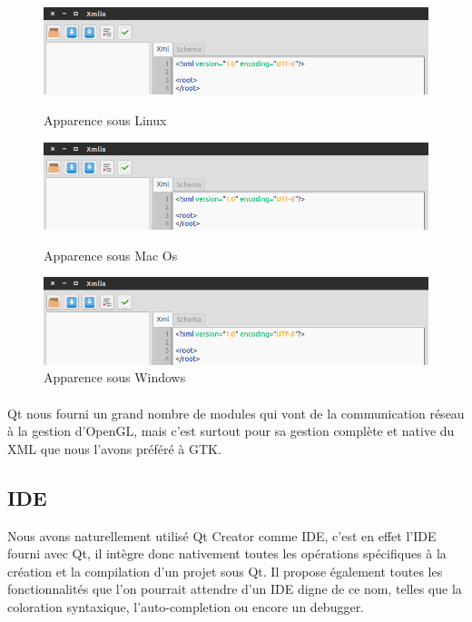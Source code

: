 \begin{figure}[h!]
\begin{minipage}[b]{\linewidth}
\centering \includegraphics[scale=0.5]{images/apparence_linux.png}
\caption{Apparence sous Linux}
\label{apparence_linux}
\end{minipage}
\begin{minipage}[b]{\linewidth}   
\centering \includegraphics[scale=0.5]{images/apparence_linux.png}
\caption{Apparence sous Mac Os}
\label{apparence_mac}
\end{minipage}
\begin{minipage}[b]{\linewidth}
\centering \includegraphics[scale=0.5]{images/apparence_linux.png}
\caption{Apparence sous Windows}
\label{apparence_windows}
\end{minipage}
\end{figure}

\paragraph{}
Qt nous fourni un grand nombre de modules qui vont de la communication réseau à la gestion d'OpenGL, mais c'est surtout pour sa gestion complète et native du XML que nous l'avons préféré à GTK.

\subsection{IDE}
Nous avons naturellement utilisé Qt Creator comme IDE, c'est en effet l'IDE fourni avec Qt, il intègre donc nativement toutes les opérations spécifiques à la création et la compilation d'un projet sous Qt. Il propose également toutes les fonctionnalités que l'on pourrait attendre d'un IDE digne de ce nom, telles que la coloration syntaxique, l'auto-completion ou encore un debugger.
